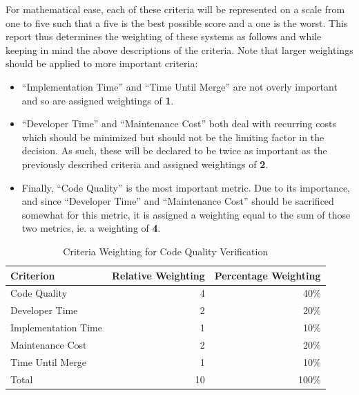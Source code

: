 \documentclass[12pt]{article}
\begin{document}
For mathematical ease, each of these criteria will be represented on a scale from one to five such that a five is the best possible score and a one is the worst. This report thus determines the weighting of these systems as follows and while keeping in mind the above descriptions of the criteria. Note that larger weightings should be applied to more important criteria:
\begin{itemize}
\item ``Implementation Time'' and ``Time Until Merge'' are not overly important and so are assigned weightings of {\bf 1}.
\item ``Developer Time'' and ``Maintenance Cost'' both deal with recurring costs which should be minimized but should not be the limiting factor in the decision. As such, these will be declared to be twice as important as the previously described criteria and assigned weightings of {\bf 2}.
\item Finally, ``Code Quality'' is the most important metric. Due to its importance, and since ``Developer Time'' and ``Maintenance Cost'' should be sacrificed somewhat for this metric, it is assigned a weighting equal to the sum of those two metrics, ie. a weighting of {\bf 4}.
\end{itemize}

\begin{table}[ht]
\caption{Criteria Weighting for Code Quality Verification}
\label{tbl:weighting-cqv}
\centering
\begin{tabular}{|l|r|r|}
    \hline
    Criterion & Relative Weighting & Percentage Weighting \\
    \hline
    \hline
    Code Quality        &  4 &  40\% \\
    Developer Time      &  2 &  20\% \\
    Implementation Time &  1 &  10\% \\
    Maintenance Cost    &  2 &  20\% \\
    Time Until Merge    &  1 &  10\% \\
    \hline
    \hline
    Total               & 10 & 100\% \\
    \hline
\end{tabular}
\end{table}
\end{document}

